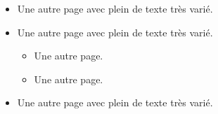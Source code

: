         \begin{itemize}
            \item Une autre page avec plein de texte très varié.
            \item Une autre page avec plein de texte très varié.
                \begin{itemize}
                    \item Une autre page.
                    \item Une autre page.
                \end{itemize}
            \item Une autre page avec plein de texte très varié.
        \end{itemize}